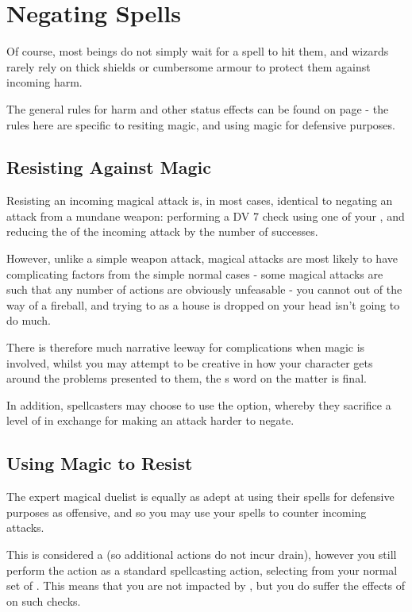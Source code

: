 \chapter{Negating Spells}

Of course, most beings do not simply wait for a spell to hit them, and wizards rarely rely on thick shields or cumbersome armour to protect them against incoming harm. 

The general rules for  harm and other status effects can be found on page \pageref{S:Defence} - the rules here are specific to resiting magic, and using magic for defensive purposes.

\section{Resisting Against Magic}

Resisting an incoming magical attack is, in most cases, identical to negating an attack from a mundane weapon: performing a DV 7 check using one of your , and reducing the  of the incoming attack by the number of successes. 

However, unlike a simple weapon attack, magical attacks are most likely to have complicating factors from the simple normal cases - some magical attacks are such that any number of  actions are obviously unfeasable - you cannot  out of the way of a  fireball, and trying to  as a house is dropped on your head isn't going to do much. 

There is therefore much narrative leeway for complications when magic is involved, whilst you may attempt to be creative in how your character gets around the problems presented to them, the s word on the matter is final.

In addition, spellcasters may choose to use the  option, whereby they sacrifice a level of  in exchange for making an attack harder to negate.
 
\section{Using Magic to Resist}

The expert magical duelist is equally as adept at using their spells for defensive purposes as offensive, and so you may use your spells to counter incoming attacks. 

This is considered a  (so additional  actions do not incur drain), however you still perform the action as a standard spellcasting action, selecting from your normal set of . This means that you are not impacted by , but you do suffer the effects of  on such checks. 

